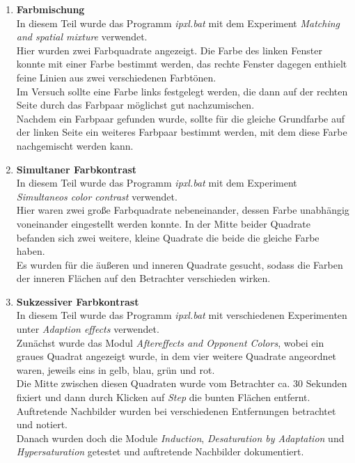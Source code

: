 \documentclass[11pt]{article}
\newcommand{\RM}[1]{\MakeUppercase{\romannumeral #1{}}}
\begin{document}
\begin{enumerate}
\item \textbf{Farbmischung \RM{2}} \\
In diesem Teil wurde das Programm \textit{ipxl.bat} mit dem Experiment \textit{Matching and spatial mixture} verwendet. \\
Hier wurden zwei Farbquadrate angezeigt. Die Farbe des linken Fenster konnte mit einer Farbe bestimmt werden, das rechte Fenster dagegen enthielt feine Linien aus zwei verschiedenen Farbtönen. \\
Im Versuch sollte eine Farbe links festgelegt werden, die dann auf der rechten Seite durch das Farbpaar möglichst gut nachzumischen. \\
Nachdem ein Farbpaar gefunden wurde, sollte für die gleiche Grundfarbe auf der linken Seite ein weiteres Farbpaar bestimmt werden, mit dem diese Farbe nachgemischt werden kann. 

\item \textbf{Simultaner Farbkontrast } \\
In diesem Teil wurde das Programm \textit{ipxl.bat} mit dem Experiment \textit{Simultaneos color contrast} verwendet. \\
Hier waren zwei große Farbquadrate nebeneinander, dessen Farbe unabhängig voneinander eingestellt werden konnte. In der Mitte beider Quadrate befanden sich zwei weitere, kleine Quadrate die beide die gleiche Farbe haben. \\
Es wurden für die äußeren und inneren Quadrate gesucht, sodass die Farben der inneren Flächen auf den Betrachter verschieden wirken. 

\item \textbf{Sukzessiver Farbkontrast } \\
In diesem Teil wurde das Programm \textit{ipxl.bat} mit verschiedenen Experimenten unter \textit{Adaption effects} verwendet. \\
Zunächst wurde das Modul \textit{Aftereffects and Opponent Colors}, wobei ein graues Quadrat angezeigt wurde, in dem vier weitere Quadrate angeordnet waren, jeweils eins in gelb, blau, grün und rot. \\
Die Mitte zwischen diesen Quadraten wurde vom Betrachter ca. 30 Sekunden fixiert und dann durch Klicken auf \textit{Step} die bunten Flächen entfernt. Auftretende Nachbilder wurden bei verschiedenen Entfernungen betrachtet und notiert. \\
Danach wurden doch die Module \textit{Induction}, \textit{Desaturation by Adaptation} und \textit{Hypersaturation} getestet und auftretende Nachbilder dokumentiert. 

\end{enumerate}
\end{document}
